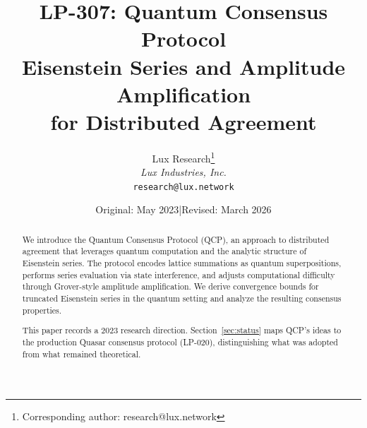 \documentclass[11pt,a4paper]{article}
\title{LP-307: Quantum Consensus Protocol\\[4pt]
\large Eisenstein Series and Amplitude Amplification\\
for Distributed Agreement}
\author{
Lux Research\thanks{Corresponding author: research@lux.network}\\
\textit{Lux Industries, Inc.}\\
\texttt{research@lux.network}
}
\date{Original: May 2023\quad|\quad Revised: March 2026}
\begin{document}
\luxcoverpage

\begin{abstract}
We introduce the Quantum Consensus Protocol (QCP), an approach to
distributed agreement that leverages quantum computation and the
analytic structure of Eisenstein series. The protocol encodes lattice
summations as quantum superpositions, performs series evaluation via
state interference, and adjusts computational difficulty through
Grover-style amplitude amplification. We derive convergence bounds for
truncated Eisenstein series in the quantum setting and analyze the
resulting consensus properties.

This paper records a 2023 research direction. Section~\ref{sec:status}
maps QCP's ideas to the production Quasar consensus protocol (LP-020),
distinguishing what was adopted from what remained theoretical.
\end{abstract}

\tableofcontents
\newpage










\end{document}
